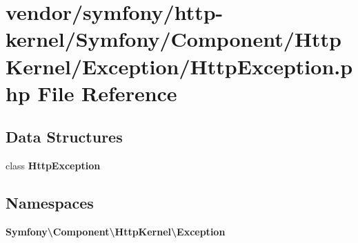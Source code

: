 \section{vendor/symfony/http-\/kernel/\+Symfony/\+Component/\+Http\+Kernel/\+Exception/\+Http\+Exception.php File Reference}
\label{_http_exception_8php}
\subsection*{Data Structures}
\begin{DoxyCompactItemize}
\item 
class {\bf Http\+Exception}
\end{DoxyCompactItemize}
\subsection*{Namespaces}
\begin{DoxyCompactItemize}
\item 
 {\bf Symfony\textbackslash{}\+Component\textbackslash{}\+Http\+Kernel\textbackslash{}\+Exception}
\end{DoxyCompactItemize}
